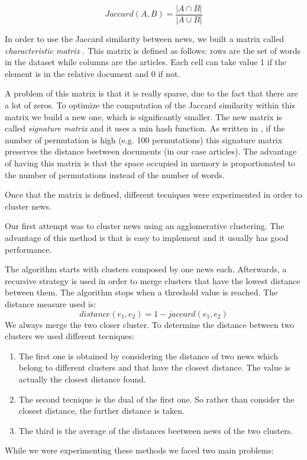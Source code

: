 \documentclass{acm_proc_article-sp}
\begin{document}
$$Jaccard(A,B) = \frac{\left\vert A \cap B \right\vert}{\left\vert A \cup B \right\vert}$$

In order to use the Jaccard similarity between news, we built a matrix called \textit{characteristic matrix} \cite{book:MMD}. This matrix is defined as follows: rows are the set of words in the dataset while columns are the articles. Each cell can take value 1 if the element is in the relative document and 0 if not.

A problem of this matrix is that it is really sparse, due to the fact that there are a lot of zeros. To optimize the computation of the Jaccard similarity within this matrix we build a new one, which is significantly smaller. The new matrix is called \textit{signature matrix} and it uses a min hash function. As written in \cite{book:MMD}, if the number of permutation is high (e.g. 100 permutations) this signature matrix preserves the distance beetween documents (in our case articles). The advantage of having this matrix is that the space occupied in memory is proportionated to the number of permutations instead of the number of words.

Once that the matrix is defined, different tecniques were experimented in order to cluster news.

Our first attempt was to cluster news using an agglomerative clustering. The advantage of this method is that is easy to implement and it usually has good performance. 

The algorithm starts with clusters composed by one news each. Afterwards, a recursive strategy is used in order to merge clusters that have the lowest distance between them. The algorithm stops when a threshold value is reached. The distance measure used is:
$$ distance(e_1,e_2) = 1 - jaccard(e_1,e_2)$$
We always merge the two closer cluster. To determine the distance between two clusters we used different tecniques:
\begin{enumerate}
\item The first one is obtained by considering the distance of two news which belong to different clusters and that have the closest distance. The value is actually the closest distance found.
\item The second tecnique is the dual of the first one. So rather than consider the closest distance, the further distance is taken.
\item The third is the average of the distances beetween news of the two clusters.
\end{enumerate}
While we were experimenting these methods we faced two main problems:
\end{document}
